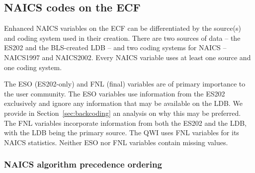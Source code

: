 %
%



%





\subsection{NAICS codes on the ECF}
\label{sec:ecf:naics}

Enhanced NAICS variables on the ECF  can be differentiated  by the source(s) and coding
system used in their creation. There are two sources of data -- the ES202 and
the BLS-created LDB --  and two coding systems for NAICS --  NAICS1997 and
NAICS2002.  Every NAICS variable uses at least one
source and one coding system.

The ESO (ES202-only) and FNL (final) variables are of primary importance to the user community. 
The ESO variables use  information from the ES202 exclusively and ignore any 
information that may be available on the LDB. We provide in  Section~\ref{sec:backcoding} an analysis on 
why this may be preferred. The FNL variables incorporate information from 
both the ES202 and the LDB, with the LDB being the primary source. The QWI
uses FNL variables for its NAICS statistics. Neither ESO nor FNL variables
contain missing values.


\subsubsection{NAICS algorithm precedence ordering}


